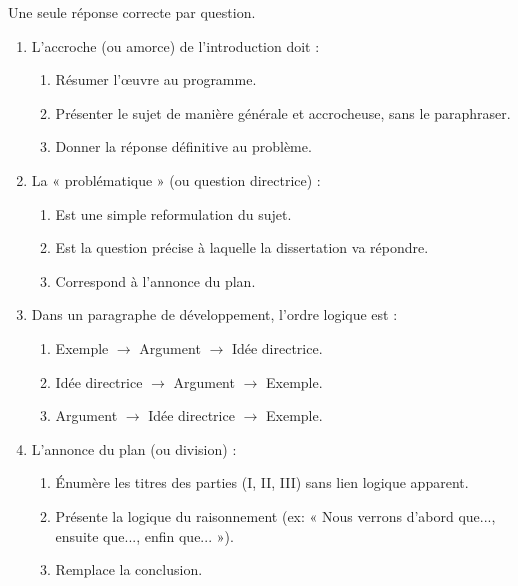 \documentclass[11pt]{article}
\begin{document}
\begin{exercice}
\noindent Une seule réponse correcte par question.
\begin{enumerate}
    \item L'accroche (ou amorce) de l'introduction doit :
    \begin{enumerate}
        \item Résumer l'œuvre au programme.
        \item Présenter le sujet de manière générale et accrocheuse, sans le paraphraser.
        \item Donner la réponse définitive au problème.
    \end{enumerate}
    \item La « problématique » (ou question directrice) :
    \begin{enumerate}
        \item Est une simple reformulation du sujet.
        \item Est la question précise à laquelle la dissertation va répondre.
        \item Correspond à l'annonce du plan.
    \end{enumerate}
    \item Dans un paragraphe de développement, l'ordre logique est :
    \begin{enumerate}
        \item Exemple $\rightarrow$ Argument $\rightarrow$ Idée directrice.
        \item Idée directrice $\rightarrow$ Argument $\rightarrow$ Exemple.
        \item Argument $\rightarrow$ Idée directrice $\rightarrow$ Exemple.
    \end{enumerate}
    \item L'annonce du plan (ou division) :
    \begin{enumerate}
        \item Énumère les titres des parties (I, II, III) sans lien logique apparent.
        \item Présente la logique du raisonnement (ex: « Nous verrons d'abord que..., ensuite que..., enfin que... »).
        \item Remplace la conclusion.
    \end{enumerate}
\end{enumerate}
\end{exercice}
\end{document}
